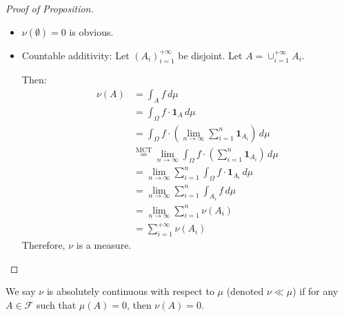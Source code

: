         \begin{proof}[Proof of Proposition]
        \begin{itemize}
            \item $\nu(\emptyset) = 0$ is obvious.
            \item Countable additivity: Let $(A_i)_{i=1}^{+\infty}$ be disjoint. Let $A = \cup_{i=1}^{+\infty} A_i$.

Then:
\begin{align*}
\nu(A) &= \int_A f\,d\mu \\
&= \int_{\Omega} f \cdot \mathbf{1}_A \,d\mu \\
&= \int_{\Omega} f \cdot \left(\lim_{n\to\infty} \sum_{i=1}^{n} \mathbf{1}_{A_i}\right) \,d\mu \\
&\stackrel{\text{MCT}}{=} \lim_{n\to\infty} \int_{\Omega} f \cdot \left(\sum_{i=1}^{n} \mathbf{1}_{A_i}\right) \,d\mu \\
&= \lim_{n\to\infty} \sum_{i=1}^{n} \int_{\Omega} f \cdot \mathbf{1}_{A_i} \,d\mu \\
&= \lim_{n\to\infty} \sum_{i=1}^{n} \int_{A_i} f \,d\mu \\
&= \lim_{n\to\infty} \sum_{i=1}^{n} \nu(A_i) \\
&= \sum_{i=1}^{+\infty} \nu(A_i)
\end{align*}
            Therefore, $\nu$ is a measure.
        \end{itemize}
        \end{proof}
        \begin{definition}[]{}
            We say $\nu$ is absolutely continuous with respect to $\mu$ (denoted $\nu \ll \mu$) if for any $A \in \mathcal{F}$ such that $\mu(A) = 0$, then $\nu(A) = 0$.
            \end{definition}
            
